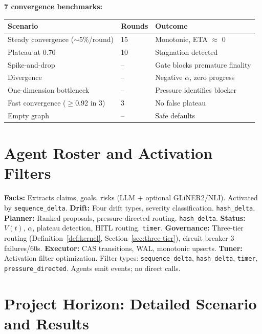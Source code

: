 \documentclass[11pt]{article}
\begin{document}
\textbf{7 convergence benchmarks:}
\begin{center}
\begin{tabular}{lll}
\toprule
Scenario & Rounds & Outcome \\
\midrule
Steady convergence ($\sim$5\%/round) & 15 & Monotonic, ETA $\approx$ 0 \\
Plateau at 0.70 & 10 & Stagnation detected \\
Spike-and-drop & -- & Gate blocks premature finality \\
Divergence & -- & Negative $\alpha$, zero progress \\
One-dimension bottleneck & -- & Pressure identifies blocker \\
Fast convergence ($\geq$0.92 in 3) & 3 & No false plateau \\
Empty graph & -- & Safe defaults \\
\bottomrule
\end{tabular}
\end{center}

\section{Agent Roster and Activation Filters}
\label{sec:app-agents}

\textbf{Facts:} Extracts claims, goals, risks (LLM + optional GLiNER2/NLI). Activated by \texttt{sequence\_delta}. \textbf{Drift:} Four drift types, severity classification. \texttt{hash\_delta}. \textbf{Planner:} Ranked proposals, pressure-directed routing. \texttt{hash\_delta}. \textbf{Status:} $V(t)$, $\alpha$, plateau detection, HITL routing. \texttt{timer}. \textbf{Governance:} Three-tier routing (Definition~\ref{def:kernel}, Section~\ref{sec:three-tier}), circuit breaker 3 failures/60s. \textbf{Executor:} CAS transitions, WAL, monotonic upserts. \textbf{Tuner:} Activation filter optimization. Filter types: \texttt{sequence\_delta}, \texttt{hash\_delta}, \texttt{timer}, \texttt{pressure\_directed}. Agents emit events; no direct calls.

\section{Project Horizon: Detailed Scenario and Results}
\label{sec:app-horizon}
\end{document}

